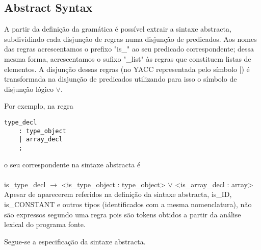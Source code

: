 \documentclass[a4paper]{article}
\begin{document}
\cleardoublepage

\subsection{Abstract Syntax}
\indent \indent A partir da definição da gramática é possível extrair a sintaxe abstracta, subdividindo cada disjunção de regras numa disjunção de predicados.
Aos nomes das regras acrescentamos o prefixo "is\_" ao seu predicado correspondente;
dessa mesma forma, acrescentamos o sufixo "\_list" às regras que constituem listas de elementos.
A disjunção dessas regras (no YACC representada pelo símbolo |) é transformada na disjunção de predicados utilizando para isso
o símbolo de disjunção lógico $\vee$.

\indent Por exemplo, na regra
\begin{verbatim}
type_decl
	: type_object
	| array_decl
	;
\end{verbatim}

o seu correspondente na sintaxe abstracta é \\ \\
is\_type\_decl $\to$ <is\_type\_object : type\_object> $\vee$ <is\_array\_decl : array> \\

\indent \indent Apesar de aparecerem referidos na definição da sintaxe abstracta, is\_ID, \\
is\_CONSTANT e outros tipos (identificados com a mesma nomenclatura),
não são expressos segundo uma regra pois são tokens obtidos a partir da análise lexical do programa fonte.

Segue-se a especificação da sintaxe abstracta.

\cleardoublepage
\end{document}
